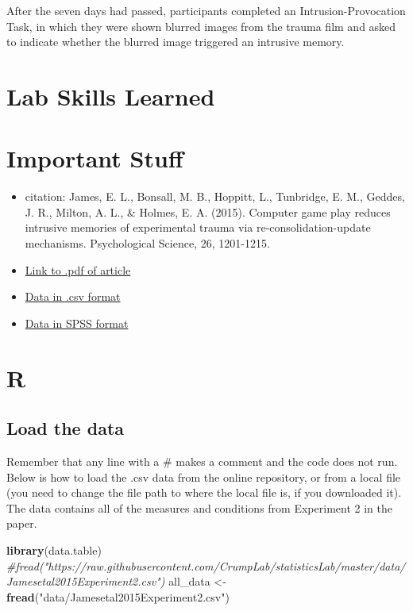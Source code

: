 \documentclass[]{book}
\newenvironment{Shaded}{\begin{snugshade}}{\end{snugshade}}
\newcommand{\KeywordTok}[1]{\textcolor[rgb]{0.13,0.29,0.53}{\textbf{{#1}}}}
\newcommand{\StringTok}[1]{\textcolor[rgb]{0.31,0.60,0.02}{{#1}}}
\newcommand{\CommentTok}[1]{\textcolor[rgb]{0.56,0.35,0.01}{\textit{{#1}}}}
\newcommand{\NormalTok}[1]{{#1}}
\providecommand{\tightlist}{%
  \setlength{\itemsep}{0pt}\setlength{\parskip}{0pt}}
\theoremstyle{definition}
\theoremstyle{definition}
\theoremstyle{definition}
\theoremstyle{remark}
\begin{document}
After the seven days had passed, participants completed an
Intrusion-Provocation Task, in which they were shown blurred images from
the trauma film and asked to indicate whether the blurred image
triggered an intrusive memory.

\section{Lab Skills Learned}\label{lab-skills-learned-2}

\section{Important Stuff}\label{important-stuff-2}

\begin{itemize}
\tightlist
\item
  citation: James, E. L., Bonsall, M. B., Hoppitt, L., Tunbridge, E. M.,
  Geddes, J. R., Milton, A. L., \& Holmes, E. A. (2015). Computer game
  play reduces intrusive memories of experimental trauma via
  re-consolidation-update mechanisms. Psychological Science, 26,
  1201-1215.
\item
  \href{http://journals.sagepub.com/stoken/default+domain/hQ2W4fbPrZVJ7eyNJaqu/full}{Link
  to .pdf of article}
\item
  \href{https://drive.google.com/open?id=0Bz-rhZ21ShvOM1cxWUpUNlQ0UlE}{Data
  in .csv format}
\item
  \href{https://drive.google.com/file/d/0Bz-rhZ21ShvOZ1lvQ0dQekZGWU0/view?usp=sharing}{Data
  in SPSS format}
\end{itemize}

\section{R}\label{r-8}

\subsection{Load the data}\label{load-the-data-2}

Remember that any line with a \# makes a comment and the code does not
run. Below is how to load the .csv data from the online repository, or
from a local file (you need to change the file path to where the local
file is, if you downloaded it). The data contains all of the measures
and conditions from Experiment 2 in the paper.

\begin{Shaded}
\begin{Highlighting}[]
\KeywordTok{library}\NormalTok{(data.table)}
\CommentTok{#fread("https://raw.githubusercontent.com/CrumpLab/statisticsLab/master/data/Jamesetal2015Experiment2.csv")}
\NormalTok{all_data <-}\StringTok{ }\KeywordTok{fread}\NormalTok{(}\StringTok{"data/Jamesetal2015Experiment2.csv"}\NormalTok{)}
\end{Highlighting}
\end{Shaded}
\end{document}
